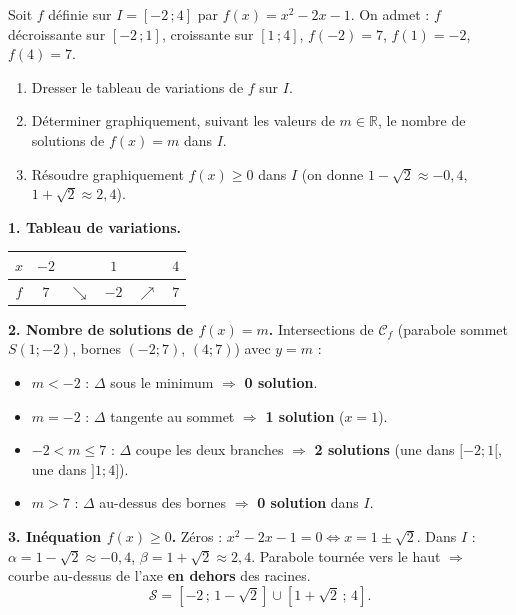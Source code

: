 \documentclass[11pt]{article}
\begin{document}
\begin{exoresolu}
Soit $f$ définie sur $I=[-2\,;4]$ par $f(x)=x^2-2x-1$. On admet : $f$ décroissante sur $[-2\,;1]$, croissante sur $[1\,;4]$, $f(-2)=7$, $f(1)=-2$, $f(4)=7$.
\begin{enumerate}
\item Dresser le tableau de variations de $f$ sur $I$.
\item Déterminer graphiquement, suivant les valeurs de $m\in\mathbb{R}$, le nombre de solutions de $f(x)=m$ dans $I$.
\item Résoudre graphiquement $f(x)\geq0$ dans $I$ (on donne $1-\sqrt{2}\approx-0{,}4$, $1+\sqrt{2}\approx2{,}4$).
\end{enumerate}
\tcblower
\textbf{1. Tableau de variations.}
\begin{center}
\begin{tabular}{|c|ccccc|}\hline
$x$ & $-2$ & & $1$ & & $4$ \\ \hline
$f$ & $7$ & $\searrow$ & $-2$ & $\nearrow$ & $7$ \\ \hline
\end{tabular}
\end{center}

\textbf{2. Nombre de solutions de $f(x)=m$.}
Intersections de $\mathcal{C}_f$ (parabole sommet $S(1;-2)$, bornes $(-2;7)$, $(4;7)$) avec $y=m$ :
\begin{itemize}
\item $m < -2$ : $\Delta$ sous le minimum $\Rightarrow$ \textbf{0 solution}.
\item $m = -2$ : $\Delta$ tangente au sommet $\Rightarrow$ \textbf{1 solution} ($x=1$).
\item $-2 < m \le 7$ : $\Delta$ coupe les deux branches $\Rightarrow$ \textbf{2 solutions} (une dans $[-2;1[$, une dans $]1;4]$).
\item $m > 7$ : $\Delta$ au-dessus des bornes $\Rightarrow$ \textbf{0 solution} dans $I$.
\end{itemize}

\textbf{3. Inéquation $f(x)\geq0$.}
Zéros : $x^2-2x-1=0 \iff x=1\pm\sqrt{2}$. Dans $I$ : $\alpha=1-\sqrt{2}\approx-0,4$, $\beta=1+\sqrt{2}\approx2,4$.
Parabole tournée vers le haut $\Rightarrow$ courbe au-dessus de l'axe \textbf{en dehors} des racines.
\[\mathcal{S}=[-2\,;\,1-\sqrt{2}]\cup[1+\sqrt{2}\,;\,4].\]
\end{exoresolu}
\end{document}
